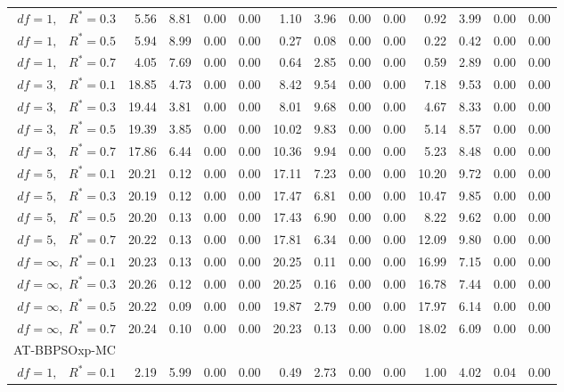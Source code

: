 \documentclass[12pt]{article}
\begin{document}
\begin{appendix}
\begin{table}[ht]
{\begin{tabular}{r|rrrr|rrrr|rrrr}
  $df = 1,\enspace$ $R^* =0.3$ & 5.56 & 8.81 & 0.00 & 0.00 & 1.10 & 3.96 & 0.00 & 0.00 & 0.92 & 3.99 & 0.00 & 0.00 \\ 
  $df = 1,\enspace$ $R^* =0.5$ & 5.94 & 8.99 & 0.00 & 0.00 & 0.27 & 0.08 & 0.00 & 0.00 & 0.22 & 0.42 & 0.00 & 0.00 \\ 
  $df = 1,\enspace$ $R^* =0.7$ & 4.05 & 7.69 & 0.00 & 0.00 & 0.64 & 2.85 & 0.00 & 0.00 & 0.59 & 2.89 & 0.00 & 0.00 \\ 
  $df = 3,\enspace$ $R^* =0.1$ & 18.85 & 4.73 & 0.00 & 0.00 & 8.42 & 9.54 & 0.00 & 0.00 & 7.18 & 9.53 & 0.00 & 0.00 \\ 
  $df = 3,\enspace$ $R^* =0.3$ & 19.44 & 3.81 & 0.00 & 0.00 & 8.01 & 9.68 & 0.00 & 0.00 & 4.67 & 8.33 & 0.00 & 0.00 \\ 
  $df = 3,\enspace$ $R^* =0.5$ & 19.39 & 3.85 & 0.00 & 0.00 & 10.02 & 9.83 & 0.00 & 0.00 & 5.14 & 8.57 & 0.00 & 0.00 \\ 
  $df = 3,\enspace$ $R^* =0.7$ & 17.86 & 6.44 & 0.00 & 0.00 & 10.36 & 9.94 & 0.00 & 0.00 & 5.23 & 8.48 & 0.00 & 0.00 \\ 
  $df = 5,\enspace$ $R^* =0.1$ & 20.21 & 0.12 & 0.00 & 0.00 & 17.11 & 7.23 & 0.00 & 0.00 & 10.20 & 9.72 & 0.00 & 0.00 \\ 
  $df = 5,\enspace$ $R^* =0.3$ & 20.19 & 0.12 & 0.00 & 0.00 & 17.47 & 6.81 & 0.00 & 0.00 & 10.47 & 9.85 & 0.00 & 0.00 \\ 
  $df = 5,\enspace$ $R^* =0.5$ & 20.20 & 0.13 & 0.00 & 0.00 & 17.43 & 6.90 & 0.00 & 0.00 & 8.22 & 9.62 & 0.00 & 0.00 \\ 
  $df = 5,\enspace$ $R^* =0.7$ & 20.22 & 0.13 & 0.00 & 0.00 & 17.81 & 6.34 & 0.00 & 0.00 & 12.09 & 9.80 & 0.00 & 0.00 \\ 
  $df = \infty,$ $R^* =0.1$ & 20.23 & 0.13 & 0.00 & 0.00 & 20.25 & 0.11 & 0.00 & 0.00 & 16.99 & 7.15 & 0.00 & 0.00 \\ 
  $df = \infty,$ $R^* =0.3$ & 20.26 & 0.12 & 0.00 & 0.00 & 20.25 & 0.16 & 0.00 & 0.00 & 16.78 & 7.44 & 0.00 & 0.00 \\ 
  $df = \infty,$ $R^* =0.5$ & 20.22 & 0.09 & 0.00 & 0.00 & 19.87 & 2.79 & 0.00 & 0.00 & 17.97 & 6.14 & 0.00 & 0.00 \\ 
  $df = \infty,$ $R^* =0.7$ & 20.24 & 0.10 & 0.00 & 0.00 & 20.23 & 0.13 & 0.00 & 0.00 & 18.02 & 6.09 & 0.00 & 0.00 \\ 
\hline
\multicolumn{1}{l|}{AT-BBPSOxp-MC} &&&&&&&&&&&&\\
  $df = 1,\enspace$ $R^* =0.1$ & 2.19 & 5.99 & 0.00 & 0.00 & 0.49 & 2.73 & 0.00 & 0.00 & 1.00 & 4.02 & 0.04 & 0.00 \\ 

\end{tabular}}
\end{table}
\end{appendix}
\end{document}

